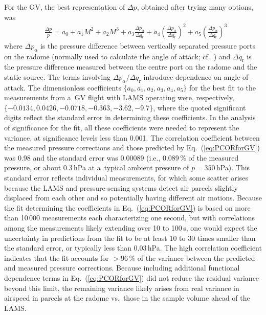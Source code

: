 \documentclass[amtd, online, hvmath]{copernicus}
\begin{document}
For the GV, the best representation of $\Delta p$, obtained after
trying many options, was
\begin{align}
    &\frac{\Delta p}{p}  = a_0+a_1M^2+a_2M^3
    +a_3\frac{\Delta p_{\alpha}}{\Delta
      q_{\mathrm{r}}}+a_4\left(\frac{\Delta p_{\alpha}}{\Delta
        q_{\mathrm{r}}}\right)^2+a_5\left(\frac{\Delta
        p_{\alpha}}{\Delta q_{\mathrm{r}}}\right)^3\label{eq:PCORforGV}
\end{align}
where $\Delta p_{\alpha}$ is the pressure difference between
vertically separated pressure ports on the radome (normally used to
calculate the angle of attack; cf.~\citealp{BrownFrieheLenschow1983})
and $\Delta q_{\mathrm{r}}$ is the pressure difference measured
between the centre port on the radome and the static source. The terms
involving $\Delta p_{\alpha}/\Delta q_{\mathrm{r}}$ introduce
dependence on angle-of-attack. The dimensionless coefficients $\{a_0,
a_1, a_2, a_3, a_4, a_5\}$ for the best fit to the measurements from
a~GV flight with LAMS operating were, respectively, $\{-0.0134,
0.0426, -0.0718, -0.363, -3.62, -9.7\}$, where the quoted significant
digits reflect the standard error in determining these
coefficients. In the analysis of significance for the fit, all these
coefficients were needed to represent the variance, at significance
levels less than 0.001. The correlation coefficient between the
measured pressure corrections and those predicted by
Eq.~(\ref{eq:PCORforGV}) was 0.98 and the standard error was 0.00089
(i.e., 0.089\,{\%} of the measured pressure, or about 0.3\,hPa at
a~typical ambient pressure of $p=350$\,hPa). This standard error
reflects individual measurements, for which some scatter arises
because the LAMS and pressure-sensing systems detect air parcels
slightly displaced from each other and so potentially having different
air motions. Because the fit determining the coefficients in
Eq.~(\ref{eq:PCORforGV}) is based on more than 10\,000 measurements
each characterizing one second, but with correlations among the
measurements likely extending over 10 to 100\,s, one would expect the
uncertainty in predictions from the fit to be at least 10 to 30 times
smaller than the standard error, or typically less than 0.03\,hPa. The
high correlation coefficient indicates that the fit accounts for
$>96$\,{\%} of the variance between the predicted and measured
pressure corrections. Because including additional functional
dependence terms in Eq.~(\ref{eq:PCORforGV}) did not reduce the
residual variance beyond this limit, the remaining variance likely
arises from real variance in airspeed in parcels at the radome
vs.~those in the sample volume ahead of the LAMS.
\end{document}

